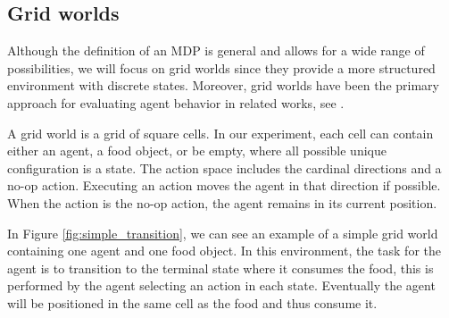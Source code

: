 \documentclass[12pt,A4]{report}
\theoremstyle{definition}
\begin{document}
\subsection{Grid worlds}
Although the definition of an MDP is general and allows for a wide range of possibilities, we will focus on grid worlds since they provide a more structured environment with discrete states. Moreover, grid worlds have been the primary approach for evaluating agent behavior in related works, see \citet{Turner20}.

A grid world is a grid of square cells. In our experiment, each cell can contain either an agent, a food object, or be empty, where all possible unique configuration is a state. The action space includes the cardinal directions and a no-op action. Executing an action moves the agent in that direction if possible. When the action is the no-op action, the agent remains in its current position. 

In Figure \ref{fig:simple_transition}, we can see an example of a simple grid world containing one agent and one food object. In this environment, the task for the agent is to transition to the terminal state where it consumes the food, this is performed by the agent selecting an action in each state. Eventually the agent will be positioned in the same cell as the food and thus consume it. 
\end{document}
